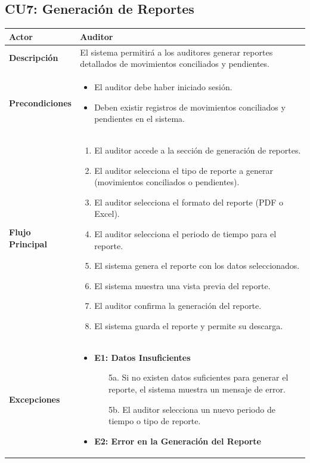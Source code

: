 \documentclass{article}
\begin{document}
\subsection{CU7: Generación de Reportes}
\begin{longtable}{|l|p{10cm}|}
\hline
\textbf{Actor} & Auditor \\ \hline
\textbf{Descripción} & El sistema permitirá a los auditores generar reportes detallados de movimientos conciliados y pendientes. \\ \hline
\textbf{Precondiciones} & 
\begin{itemize}
    \item El auditor debe haber iniciado sesión.
    \item Deben existir registros de movimientos conciliados y pendientes en el sistema.
\end{itemize} \\ \hline
\textbf{Flujo Principal} & 
\begin{enumerate}
    \item El auditor accede a la sección de generación de reportes.
    \item El auditor selecciona el tipo de reporte a generar (movimientos conciliados o pendientes).
    \item El auditor selecciona el formato del reporte (PDF o Excel).
    \item El auditor selecciona el periodo de tiempo para el reporte.
    \item El sistema genera el reporte con los datos seleccionados.
    \item El sistema muestra una vista previa del reporte.
    \item El auditor confirma la generación del reporte.
    \item El sistema guarda el reporte y permite su descarga.
\end{enumerate} \\ \hline
\textbf{Excepciones} & 
\begin{itemize}
    \item \textbf{E1: Datos Insuficientes}
    \begin{enumerate}
        \item[5a.] Si no existen datos suficientes para generar el reporte, el sistema muestra un mensaje de error.
        \item[5b.] El auditor selecciona un nuevo periodo de tiempo o tipo de reporte.
    \end{enumerate}
    \item \textbf{E2: Error en la Generación del Reporte}

\end{itemize}
\end{longtable}
\end{document}
